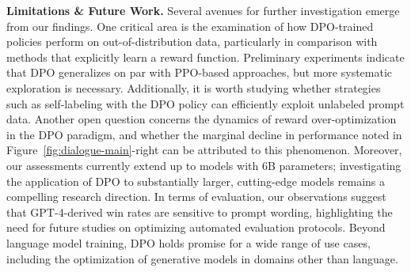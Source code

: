 \textbf{Limitations \& Future Work.} Several avenues for further investigation emerge from our findings. One critical area is the examination of how DPO-trained policies perform on out-of-distribution data, particularly in comparison with methods that explicitly learn a reward function. Preliminary experiments indicate that DPO generalizes on par with PPO-based approaches, but more systematic exploration is necessary. Additionally, it is worth studying whether strategies such as self-labeling with the DPO policy can efficiently exploit unlabeled prompt data. Another open question concerns the dynamics of reward over-optimization in the DPO paradigm, and whether the marginal decline in performance noted in Figure~\ref{fig:dialogue-main}-right can be attributed to this phenomenon. Moreover, our assessments currently extend up to models with 6B parameters; investigating the application of DPO to substantially larger, cutting-edge models remains a compelling research direction. In terms of evaluation, our observations suggest that GPT-4-derived win rates are sensitive to prompt wording, highlighting the need for future studies on optimizing automated evaluation protocols. Beyond language model training, DPO holds promise for a wide range of use cases, including the optimization of generative models in domains other than language.